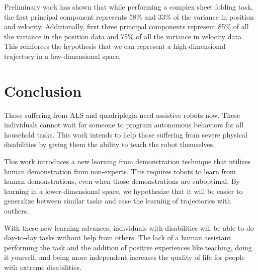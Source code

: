 \documentclass{sig-alternate}
\begin{document}
Preliminary work has shown that while performing a complex sheet folding task, the first principal component represents 58\% and 33\% of the variance in position and velocity. Additionally, first three principal components represent 85\% of all the variance in the position data and 75\% of all the variance in velocity data. This reinforces the hypothesis that we can represent a high-dimensional trajectory in a low-dimensional space.


\section{Conclusion}

Those suffering from ALS and quadriplegia need assistive robots now. These individuals cannot wait for someone to program autonomous behaviors for all household tasks.  This work intends to help those suffering from severe physical disabilities by giving them the ability to teach the robot themselves.

This work introduces a new learning from demonstration technique that utilizes human demonstration from non-experts. This requires robots to learn from human demonstrations, even when those demonstrations are suboptimal. By learning in a lower-dimensional space, we hypothesize that it will be easier to generalize between similar tasks and ease the learning of trajectories with outliers.

With these new learning advances, individuals with disabilities will be able to do day-to-day tasks without help from others. The lack of a human assistant performing the task and the addition of positive experiences like teaching, doing it yourself, and being more independent increases the quality of life for people with extreme disabilities.



\end{document}
